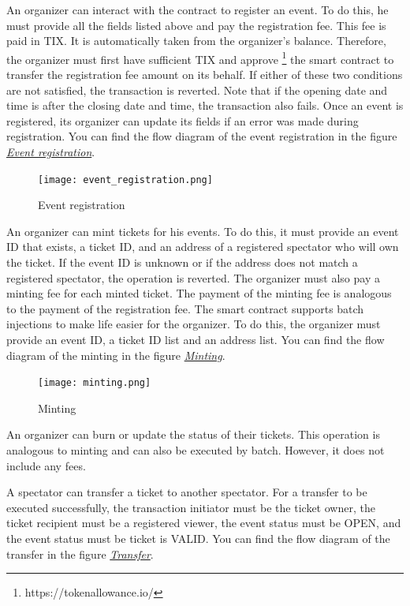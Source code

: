 \documentclass[a4paper,11pt,oneside]{report}
\begin{document}
An organizer can interact with the contract to register an event. To do this, he must provide all the fields listed above and pay the registration fee. This fee is paid in TIX. It is automatically taken from the organizer's balance. Therefore, the organizer must first have sufficient TIX and approve \footnote{https://tokenallowance.io/} the smart contract to transfer the registration fee amount on its behalf. If either of these two conditions are not satisfied, the transaction is reverted. Note that if the opening date and time is after the closing date and time, the transaction also fails. Once an event is registered, its organizer can update its fields if an error was made during registration. You can find the flow diagram of the event registration in the figure  \hyperref[fig:event_registration]{ \textit{Event registration}}.

\begin{figure}[h!]
  \texttt{[image: event\_registration.png]}
  \caption{Event registration}
  \label{fig:event_registration}
\end{figure}

An organizer can mint tickets for his events. To do this, it must provide an event ID that exists, a ticket ID, and an address of a registered spectator who will own the ticket. If the event ID is unknown or if the address does not match a registered spectator, the operation is reverted. The organizer must also pay a minting fee for each minted ticket. The payment of the minting fee is analogous to the payment of the registration fee. The smart contract supports batch injections to make life easier for the organizer. To do this, the organizer must provide an event ID, a ticket ID list and an address list. You can find the flow diagram of the minting in the figure  \hyperref[fig:minting]{ \textit{Minting}}.

\begin{figure}[h!]
  \texttt{[image: minting.png]}
  \caption{Minting}
  \label{fig:minting}
\end{figure}

An organizer can burn or update the status of their tickets. This operation is analogous to minting and can also be executed by batch. However, it does not include any fees.

A spectator can transfer a ticket to another spectator. For a transfer to be executed successfully, the transaction initiator must be the ticket owner, the ticket recipient must be a registered viewer, the event status must be OPEN, and the event status must be ticket is VALID. You can find the flow diagram of the transfer in the figure \hyperref[fig:transfer]{ \textit{Transfer}}.
\end{document}
